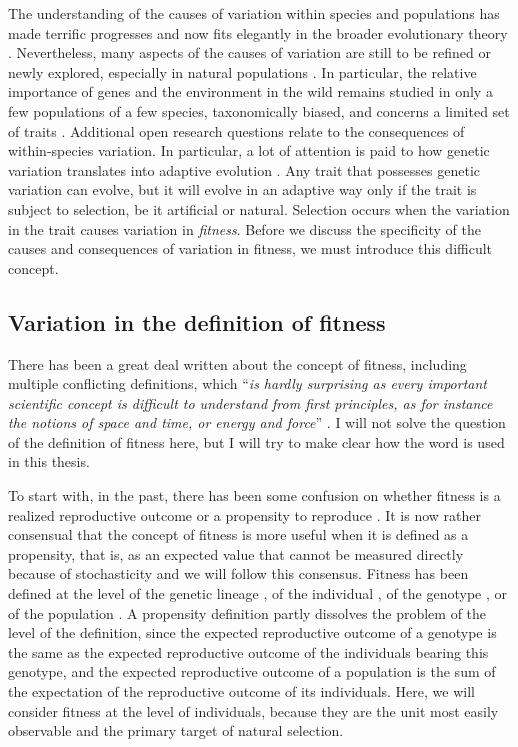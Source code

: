 The understanding of the causes of variation within species and populations has made terrific progresses and now fits elegantly in the broader evolutionary theory \parencite{Pigliucci2010}. Nevertheless, many aspects of the causes of variation are still to be refined or newly explored, especially in natural populations \parencite{Kruuk2014}. In particular, the relative importance of genes and the environment in the wild remains studied in only a few populations of a few species, taxonomically biased, and concerns a limited set of traits \parencite{Lynch1998, Postma2014}. 
Additional open research questions relate to the consequences of within-species variation. In particular, a lot of attention is paid to how genetic variation translates into adaptive evolution \parencite{Brookfield2016}.
Any trait that possesses genetic variation can evolve, but it will evolve in an adaptive way only if the trait is subject to selection, be it artificial or natural. Selection occurs when the variation in the trait causes variation in \emph{fitness}. Before we discuss the specificity of the causes and consequences of variation in fitness, we must introduce this difficult concept.

\subsection{Variation in the definition of fitness}
There has been a great deal written about the concept of fitness, including multiple conflicting definitions, which ``\emph{is hardly surprising as every important scientific concept is difficult to understand from first principles, as for instance the notions of space and time, or energy and force}'' \parencite[p. 1358][]{Wagner2010}. I will not solve the question of the definition of fitness here, but I will try to make clear how the word is used in this thesis.

To start with, in the past, there has been some confusion on whether fitness is a realized reproductive outcome or a propensity to reproduce \parencite{Brandon1984}. It is now rather consensual that the concept of fitness is more useful when it is defined as a propensity, that is, as an expected value that cannot be measured directly because of stochasticity \parencite{Brandon1984,Price1996,Krimbas2004} and we will follow this consensus. Fitness has been defined at the level of the genetic lineage \parencite[e.g.][]{Akc2016}, of the individual \parencite[e.g.][]{Cam2000}, of the genotype \parencite[e.g.][]{Steiner2012}, or of the population \parencite[e.g.][]{vanTienderen2000}. A propensity definition partly dissolves the problem of the level of the definition, since the expected reproductive outcome of a genotype is the same as the expected reproductive outcome of the individuals bearing this genotype, and the expected reproductive outcome of a population is the sum of the expectation of the reproductive outcome of its individuals. Here, we will consider fitness at the level of individuals, because they are the unit most easily observable and the primary target of natural selection.

